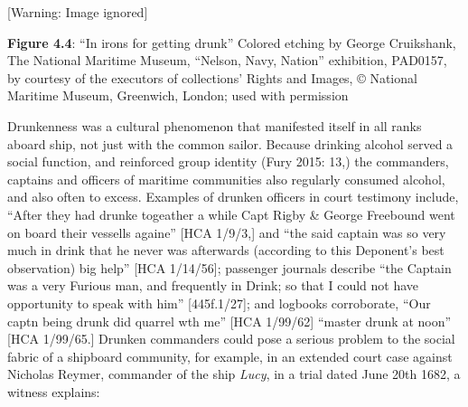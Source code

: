 \begin{center}
 [Warning: Image ignored] %

\end{center}
\begin{styleStandard}
\textbf{Figure 4.4}: “In irons for getting drunk” Colored etching by George Cruikshank, The National Maritime Museum, “Nelson, Navy, Nation” exhibition, PAD0157, by courtesy of the executors of collections’ Rights and Images, © National Maritime Museum, Greenwich, London; used with permission
\end{styleStandard}


\begin{styleStandard}
Drunkenness was a cultural phenomenon that manifested itself in all ranks aboard ship, not just with the common sailor. Because drinking alcohol served a social function, and reinforced group identity (Fury 2015: 13,) the commanders, captains and officers of maritime communities also regularly consumed alcohol, and also often to excess. Examples of drunken officers in court testimony include, “After they had drunke togeather a while Capt Rigby \& George Freebound went on board their vessells againe” [HCA 1/9/3,] and “the said captain was so very much in drink that he never was afterwards (according to this Deponent’s best observation) big help” [HCA 1/14/56]; passenger journals describe “the Captain was a very Furious man, and frequently in Drink; so that I could not have opportunity to speak with him” [445f.1/27]; and logbooks corroborate, “Our captn being drunk did quarrel wth me” [HCA 1/99/62] “master drunk at noon” [HCA 1/99/65.] Drunken commanders could pose a serious problem to the social fabric of a shipboard community, for example, in an extended court case against Nicholas Reymer, commander of the ship \textit{Lucy}, in a trial dated June 20th 1682, a witness explains:
\end{styleStandard}


